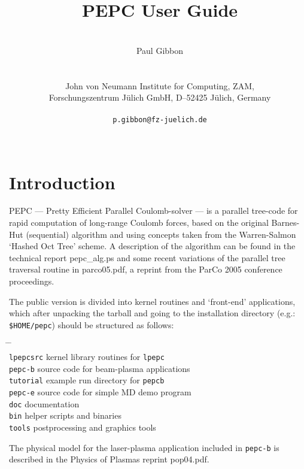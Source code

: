 \documentclass[11pt,psfig]{article}
\title{PEPC User Guide\\}
\author{\\ Paul Gibbon \\ \\ \\
John von Neumann Institute for Computing, ZAM,\\
Forschungszentrum J\"ulich GmbH, D--52425 J\"ulich, Germany\\ \\  {\tt p.gibbon@fz-juelich.de} \\\\
}
\begin{document}
\maketitle
\pagebreak

\begin{tableofcontents}
\end{tableofcontents}

\pagebreak

\section{Introduction}
\normalsize
PEPC --- Pretty Efficient Parallel Coulomb-solver --- is a parallel tree-code 
for rapid computation of long-range Coulomb forces, based on the original
Barnes-Hut (sequential) algorithm and using concepts taken from the
Warren-Salmon `Hashed Oct Tree' scheme.  A description of the algorithm can be
found in the technical report pepc\_alg.ps and some recent variations of the parallel tree
traversal routine in parco05.pdf, a reprint from the ParCo 2005 conference proceedings.

\medskip\noindent
The public version is divided into kernel routines and `front-end'
applications, which after unpacking the tarball and going to the installation
directory (e.g.: {\tt \$HOME/pepc}) should be structured as follows:
\begin{tabbing}
\hspace{1cm} \= \hspace{4cm} \= \hspace{1cm} \\
\> \texttt{lpepcsrc} \> kernel library routines for {\tt lpepc}\\
\> \texttt{pepc-b} \> source code for beam-plasma applications \\
\> \texttt{tutorial} \> example run directory for {\tt pepcb}\\
\> \texttt{pepc-e} \> source code for simple MD demo program \\
\> \texttt{doc} \> documentation\\
\> \texttt{bin} \> helper scripts and binaries\\
\> \texttt{tools} \> postprocessing and graphics tools
\end{tabbing}

\noindent 
The physical model for the laser-plasma application included in \texttt{pepc-b} is described in the Physics of Plasmas reprint pop04.pdf.
\end{document}
